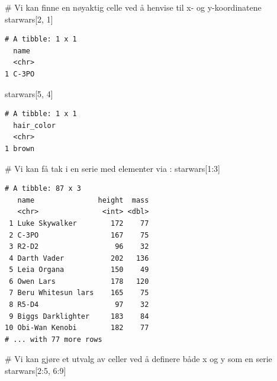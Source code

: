 \documentclass[
  letterpaper,
  DIV=11,
  numbers=noendperiod]{scrartcl}
\newenvironment{Shaded}{\begin{snugshade}}{\end{snugshade}}
\newcommand{\CommentTok}[1]{\textcolor[rgb]{0.37,0.37,0.37}{#1}}
\newcommand{\DecValTok}[1]{\textcolor[rgb]{0.68,0.00,0.00}{#1}}
\newcommand{\NormalTok}[1]{\textcolor[rgb]{0.00,0.23,0.31}{#1}}
\newcommand{\SpecialCharTok}[1]{\textcolor[rgb]{0.37,0.37,0.37}{#1}}
\begin{document}
\begin{Shaded}
\begin{Highlighting}[]
\CommentTok{\# Vi kan finne en nøyaktig celle ved å henvise til x{-} og y{-}koordinatene}
\NormalTok{starwars[}\DecValTok{2}\NormalTok{, }\DecValTok{1}\NormalTok{]}
\end{Highlighting}
\end{Shaded}

\begin{verbatim}
# A tibble: 1 x 1
  name 
  <chr>
1 C-3PO
\end{verbatim}

\begin{Shaded}
\begin{Highlighting}[]
\NormalTok{starwars[}\DecValTok{5}\NormalTok{, }\DecValTok{4}\NormalTok{]}
\end{Highlighting}
\end{Shaded}

\begin{verbatim}
# A tibble: 1 x 1
  hair_color
  <chr>     
1 brown     
\end{verbatim}

\begin{Shaded}
\begin{Highlighting}[]
\CommentTok{\# Vi kan få tak i en serie med elementer via \textasciigrave{}:\textasciigrave{}}
\NormalTok{starwars[}\DecValTok{1}\SpecialCharTok{:}\DecValTok{3}\NormalTok{]}
\end{Highlighting}
\end{Shaded}

\begin{verbatim}
# A tibble: 87 x 3
   name               height  mass
   <chr>               <int> <dbl>
 1 Luke Skywalker        172    77
 2 C-3PO                 167    75
 3 R2-D2                  96    32
 4 Darth Vader           202   136
 5 Leia Organa           150    49
 6 Owen Lars             178   120
 7 Beru Whitesun lars    165    75
 8 R5-D4                  97    32
 9 Biggs Darklighter     183    84
10 Obi-Wan Kenobi        182    77
# ... with 77 more rows
\end{verbatim}

\begin{Shaded}
\begin{Highlighting}[]
\CommentTok{\# Vi kan gjøre et utvalg av celler ved å definere både x og y som en serie}
\NormalTok{starwars[}\DecValTok{2}\SpecialCharTok{:}\DecValTok{5}\NormalTok{, }\DecValTok{6}\SpecialCharTok{:}\DecValTok{9}\NormalTok{]}
\end{Highlighting}
\end{Shaded}
\end{document}
